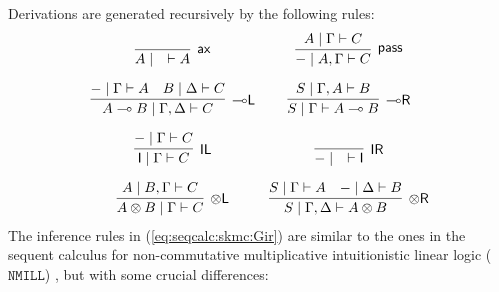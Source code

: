 \documentclass[sn-mathphys-num]{sn-jnl}%
\newcommand{\GG}{\Gamma}
\newcommand{\GD}{\Delta}
\newcommand{\vd}{\vdash}
\newcommand{\tl}{\otimes \mathsf{L}}
\newcommand{\tr}{\otimes\mathsf{R}}
\newcommand{\pass}{\mathsf{pass}}
\newcommand{\unitl}{\mathsf{IL}}
\newcommand{\unitr}{\mathsf{IR}}
\newcommand{\ax}{\mathsf{ax}}
\newcommand{\ot}{\otimes}
\newcommand{\lolli}{\multimap}
\newcommand{\lleft}{{\lolli}\mathsf{L}}
\newcommand{\lright}{{\lolli}\mathsf{R}}
\newcommand{\unit}{\mathsf{I}}
\newcommand{\NMILL}{$\mathtt{NMILL}$}
\theoremstyle{thmstyleone}%
\theoremstyle{thmstyletwo}%
\theoremstyle{thmstylethree}%
\begin{document}
Derivations are generated recursively by the following rules:
\begin{equation}\label{eq:seqcalc:skmc:Gir}
  \begin{array}{cc}
    \infer[\ax]{A \mid \quad \vd A}{}
    &
    \infer[\pass]{{-} \mid A , \GG \vd C}{A \mid \GG \vd C}
    \\[10pt]
    \infer[\lleft]{A \lolli B \mid \GG , \GD \vd C}{
    {-} \mid \GG \vd A
    &
    B \mid \GD \vd C
    }
    &
    \infer[\lright]{S \mid \GG \vd A \lolli B}{S \mid \GG , A \vd B}
    \\[10pt]
    \infer[\unitl]{\unit \mid \GG \vd C}{{-} \mid \GG \vd C}
    &
    \infer[\unitr]{{-} \mid \quad \vd \unit}{}
    \\[10pt]
    \infer[\tl]{A \ot B \mid \GG \vd C}{A \mid B , \GG \vd C}
    &
    \infer[\tr]{S \mid \GG , \GD \vd A \ot B}{
    S \mid \GG \vd A
    &
    {-} \mid \GD \vd B
    }
  \end{array}
\end{equation}
The inference rules in (\ref{eq:seqcalc:skmc:Gir}) are similar to the ones in the sequent calculus for non-commutative multiplicative intuitionistic linear logic (\NMILL) \cite{abrusci:noncommutative:1990}, but with some crucial differences: 
\end{document}

